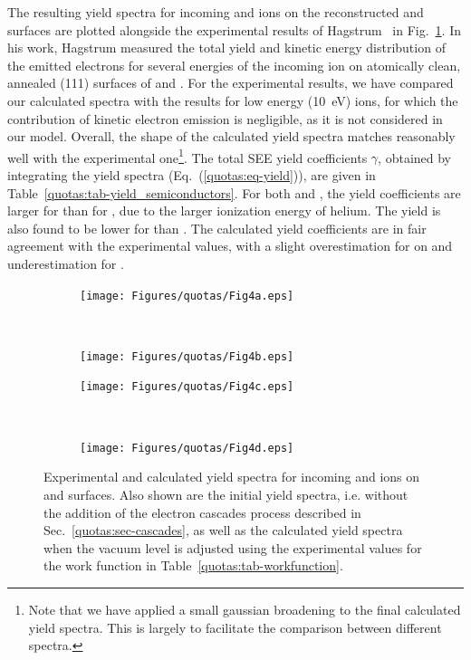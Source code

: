 \begin{refsection}
The resulting yield spectra for incoming  and  ions on the 
reconstructed  and  surfaces are plotted alongside the 
experimental results of Hagstrum~\cite{Hagstrum1960} in 
Fig.~\ref{quotas:fig-results_semiconductors}. In his work, Hagstrum measured 
the total yield and kinetic energy distribution of the emitted electrons for 
several energies of the incoming ion on atomically clean, annealed (111) 
surfaces of  and . For the experimental results, we have 
compared our calculated spectra with the results for low energy 
(10~\si{\electronvolt}) ions, for which the contribution of kinetic electron 
emission is negligible, as it is not considered in our model. 
Overall, the shape of the calculated yield spectra matches reasonably well 
with the experimental one\footnote{Note that we have applied a small gaussian 
broadening to the final calculated yield spectra. This is largely to facilitate 
the comparison between different spectra.}. 
The total SEE yield coefficients $\gamma$, obtained 
by integrating the yield spectra (Eq.~(\ref{quotas:eq-yield})), are given in 
Table~\ref{quotas:tab-yield_semiconductors}. For both  and , the 
yield coefficients are larger for  than for , due to the 
larger ionization energy of helium. The yield is also found to 
be lower for  than . The calculated yield coefficients 
are in fair agreement with the experimental values, with a slight 
overestimation for  on  and underestimation for 
. 

\begin{figure}[ht] 
    \centering 
    \begin{subfigure}[t]{0.49\textwidth} 
        \centering 
        \texttt{[image: Figures/quotas/Fig4a.eps]} 
    \end{subfigure}%
    ~  
    \begin{subfigure}[t]{0.49\textwidth} 
        \centering 
        \texttt{[image: Figures/quotas/Fig4b.eps]} 
    \end{subfigure} 
    \begin{subfigure}[t]{0.49\textwidth} 
        \centering 
        \texttt{[image: Figures/quotas/Fig4c.eps]} 
    \end{subfigure}%
    ~  
    \begin{subfigure}[t]{0.49\textwidth} 
        \centering 
        \texttt{[image: Figures/quotas/Fig4d.eps]} 
    \end{subfigure} 
    \caption{\label{quotas:fig-results_semiconductors} Experimental and 
calculated yield spectra for incoming  and  ions on 
 and  surfaces. Also shown are the initial yield 
spectra, i.e. without the addition of the electron cascades process described 
in Sec.~\ref{quotas:sec-cascades}, as well as the calculated yield spectra 
when the vacuum level is adjusted using the experimental values for the work 
function in Table~\ref{quotas:tab-workfunction}.} 
\end{figure} 


\end{refsection}
